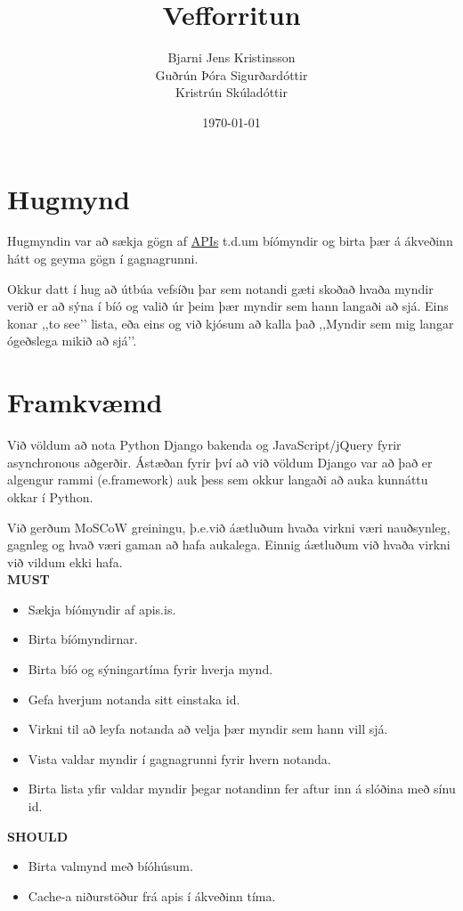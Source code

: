 \documentclass[a4paper,oneside]{article}
\title{Vefforritun}
\date{\today}
\author{Bjarni Jens Kristinsson \\ Guðrún Þóra Sigurðardóttir \\ Kristrún Skúladóttir}
\begin{document}
\maketitle

\section{Hugmynd}
Hugmyndin var að sækja gögn af \href{http://docs.apis.is/}{APIs} t.d.\@ um bíómyndir
og birta þær á ákveðinn hátt og geyma gögn í gagnagrunni.

Okkur datt í hug að útbúa vefsíðu þar sem notandi gæti skoðað hvaða myndir verið er
að sýna í bíó og valið úr þeim þær myndir sem hann langaði að sjá. Eins konar ,,to see’’
lista, eða eins og við kjósum að kalla það ,,Myndir sem mig langar ógeðslega mikið að sjá’’.

\section{Framkvæmd}
Við völdum að nota Python Django bakenda og JavaScript/jQuery fyrir asynchronous aðgerðir.  Ástæðan fyrir því að við völdum Django var að það er algengur rammi (e.\@ framework) auk þess sem okkur langaði að auka kunnáttu okkar í Python.

Við gerðum MoSCoW greiningu, þ.e.\@ við áætluðum hvaða virkni væri nauðsynleg, gagnleg
og hvað væri gaman að hafa aukalega. Einnig áætluðum við hvaða virkni við vildum ekki hafa. \\

\noindent\textbf{MUST}
\begin{itemize} 
    \item Sækja bíómyndir af apis.is.
    \item Birta bíómyndirnar.
    \item Birta bíó og sýningartíma fyrir hverja mynd.
    \item Gefa hverjum notanda sitt einstaka id.
    \item Virkni til að leyfa notanda að velja þær myndir sem hann vill sjá.
    \item Vista valdar myndir í gagnagrunni fyrir hvern notanda.
    \item Birta lista yfir valdar myndir þegar notandinn fer aftur inn á slóðina með sínu id.
\end{itemize}

\noindent\textbf{SHOULD}
\begin{itemize} 
    \item Birta valmynd með bíóhúsum.
    \item Cache-a niðurstöður frá apis í ákveðinn tíma.
\end{itemize}
\end{document}
